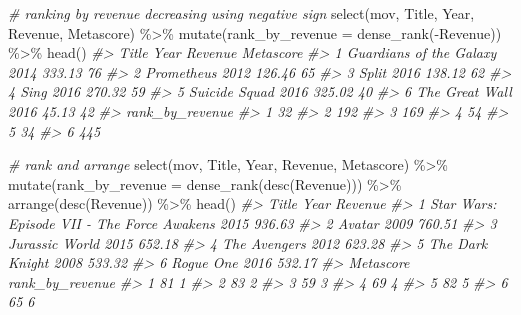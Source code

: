 \documentclass[
]{book}
\newenvironment{Shaded}{\begin{snugshade}}{\end{snugshade}}
\newcommand{\AttributeTok}[1]{\textcolor[rgb]{0.77,0.63,0.00}{#1}}
\newcommand{\CommentTok}[1]{\textcolor[rgb]{0.56,0.35,0.01}{\textit{#1}}}
\newcommand{\FunctionTok}[1]{\textcolor[rgb]{0.00,0.00,0.00}{#1}}
\newcommand{\NormalTok}[1]{#1}
\newcommand{\SpecialCharTok}[1]{\textcolor[rgb]{0.00,0.00,0.00}{#1}}
\begin{document}
\begin{Shaded}
\begin{Highlighting}[]
\CommentTok{\# ranking by revenue decreasing using negative sign}
\FunctionTok{select}\NormalTok{(mov, Title, Year, Revenue, Metascore) }\SpecialCharTok{\%\textgreater{}\%}
  \FunctionTok{mutate}\NormalTok{(}\AttributeTok{rank\_by\_revenue =} \FunctionTok{dense\_rank}\NormalTok{(}\SpecialCharTok{{-}}\NormalTok{Revenue)) }\SpecialCharTok{\%\textgreater{}\%}
  \FunctionTok{head}\NormalTok{()}
\CommentTok{\#\textgreater{}                     Title Year Revenue Metascore}
\CommentTok{\#\textgreater{} 1 Guardians of the Galaxy 2014  333.13        76}
\CommentTok{\#\textgreater{} 2              Prometheus 2012  126.46        65}
\CommentTok{\#\textgreater{} 3                   Split 2016  138.12        62}
\CommentTok{\#\textgreater{} 4                    Sing 2016  270.32        59}
\CommentTok{\#\textgreater{} 5           Suicide Squad 2016  325.02        40}
\CommentTok{\#\textgreater{} 6          The Great Wall 2016   45.13        42}
\CommentTok{\#\textgreater{}   rank\_by\_revenue}
\CommentTok{\#\textgreater{} 1              32}
\CommentTok{\#\textgreater{} 2             192}
\CommentTok{\#\textgreater{} 3             169}
\CommentTok{\#\textgreater{} 4              54}
\CommentTok{\#\textgreater{} 5              34}
\CommentTok{\#\textgreater{} 6             445}

\CommentTok{\# rank and arrange}
\FunctionTok{select}\NormalTok{(mov, Title, Year, Revenue, Metascore) }\SpecialCharTok{\%\textgreater{}\%}
  \FunctionTok{mutate}\NormalTok{(}\AttributeTok{rank\_by\_revenue =} \FunctionTok{dense\_rank}\NormalTok{(}\FunctionTok{desc}\NormalTok{(Revenue))) }\SpecialCharTok{\%\textgreater{}\%}
  \FunctionTok{arrange}\NormalTok{(}\FunctionTok{desc}\NormalTok{(Revenue)) }\SpecialCharTok{\%\textgreater{}\%}
  \FunctionTok{head}\NormalTok{()}
\CommentTok{\#\textgreater{}                                        Title Year Revenue}
\CommentTok{\#\textgreater{} 1 Star Wars: Episode VII {-} The Force Awakens 2015  936.63}
\CommentTok{\#\textgreater{} 2                                     Avatar 2009  760.51}
\CommentTok{\#\textgreater{} 3                             Jurassic World 2015  652.18}
\CommentTok{\#\textgreater{} 4                               The Avengers 2012  623.28}
\CommentTok{\#\textgreater{} 5                            The Dark Knight 2008  533.32}
\CommentTok{\#\textgreater{} 6                                  Rogue One 2016  532.17}
\CommentTok{\#\textgreater{}   Metascore rank\_by\_revenue}
\CommentTok{\#\textgreater{} 1        81               1}
\CommentTok{\#\textgreater{} 2        83               2}
\CommentTok{\#\textgreater{} 3        59               3}
\CommentTok{\#\textgreater{} 4        69               4}
\CommentTok{\#\textgreater{} 5        82               5}
\CommentTok{\#\textgreater{} 6        65               6}


\end{Highlighting}
\end{Shaded}
\end{document}
